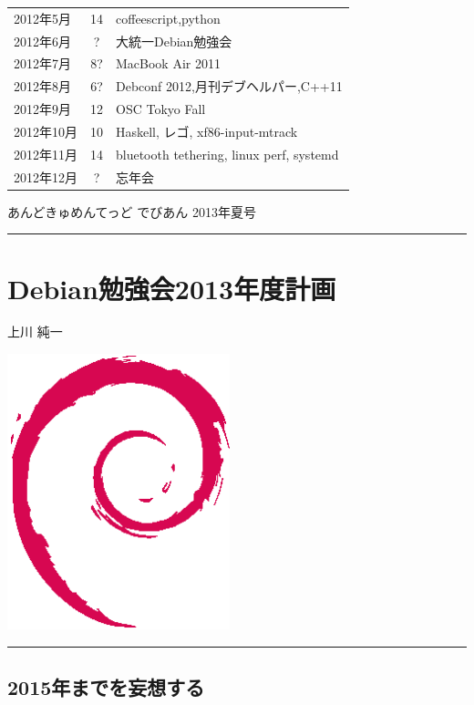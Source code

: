 \documentclass[mingoth,a4paper]{jsarticle}
\renewcommand{\dancersection}[2]{%
\newpage
あんどきゅめんてっど でびあん 2013年夏号
%
\vspace{0.1mm}\\
{\color{dancerdarkblue}\rule{\hsize}{2mm}}

%
%
\begin{minipage}[t]{0.6\hsize}
\color{dancerdarkblue}
\vspace{1cm}
\section{#1}
\hfill{}#2\\
\end{minipage}
\begin{minipage}[t]{0.4\hsize}
\vspace{-2cm}
\hfill{}\includegraphics[height=8cm]{image200502/openlogo-nd.eps}\\
\vspace{-5cm}
\end{minipage}
%
{\color{dancerlightblue}\rule{0.66\hsize}{2mm}}
%
\vspace{2cm}
}
\begin{document}
\begin{table}[t]
\begin{minipage}{0.5\hsize}
\begin{center}
\begin{tabular}{|l|c|p{12em}|}
   2012年5月 & 14 & coffeescript,python\\
   2012年6月 & ? & 大統一Debian勉強会 \\
   2012年7月 & 8? & MacBook Air 2011\\
   2012年8月 & 6? & Debconf 2012,月刊デブヘルパー,C++11 \\
   2012年9月 & 12 & OSC Tokyo Fall\\
   2012年10月 & 10 & Haskell, レゴ, xf86-input-mtrack\\
   2012年11月 & 14 & bluetooth tethering, linux perf, systemd\\
   2012年12月 & ? & 忘年会 \\

 \hline
  \end{tabular}
 \end{center}
\end{minipage}
\end{table}
\clearpage 

\dancersection{Debian勉強会2013年度計画}{上川 純一}

\subsection{2015年までを妄想する}
\end{document}
